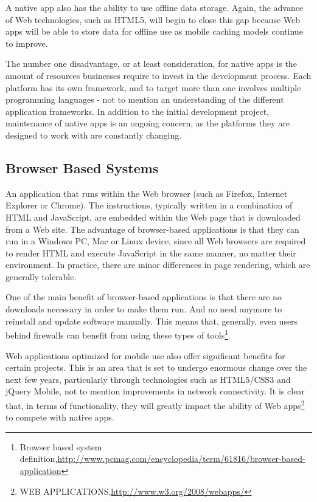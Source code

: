 A native app also has the ability to use offline data storage. Again, the advance of Web technologies, such as HTML5, will begin to close this gap because Web apps will be able to store data for offline use as mobile caching models continue to improve.

The number one disadvantage, or at least consideration, for native apps is the amount of resources businesses require to invest in the development process. Each platform has its own framework, and to target more than one involves multiple programming languages - not to mention an understanding of the different application frameworks. In addition to the initial development project, maintenance of native apps is an ongoing concern, as the platforms they are designed to work with are constantly changing.

\subsection{Browser Based Systems}
An application that runs within the Web browser (such as Firefox, Internet Explorer or Chrome). The instructions, typically written in a combination of HTML and JavaScript, are embedded within the Web page that is downloaded from a Web site. The advantage of browser-based applications is that they can run in a Windows PC, Mac or Linux device, since all Web browsers are required to render HTML and execute JavaScript in the same manner, no matter their environment. In practice, there are minor differences in page rendering, which are generally tolerable. 

One of the main benefit of browser-based applications is that there are no downloads necessary in order to make them run. And no need anymore to reinstall and update software manually. This means that, generally, even users behind firewalls can benefit from using these types of tools\footnote{Browser based system definition,\url{http://www.pcmag.com/encyclopedia/term/61816/browser-based-application}}.

Web applications optimized for mobile use also offer significant benefits for certain projects. This is an area that is set to undergo enormous change over the next few years, particularly through technologies such as HTML5/CSS3 and jQuery Mobile, not to mention improvements in network connectivity. It is clear that, in terms of functionality, they will greatly impact the ability of Web apps\footnote{WEB APPLICATIONS,\url{http://www.w3.org/2008/webapps/}} to compete with native apps.

